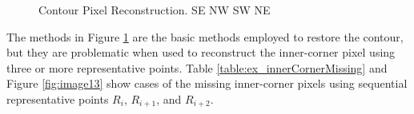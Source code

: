 \begin{figure}[htbp]
	\centering
	\caption{Contour Pixel Reconstruction. \protect{} SE \protect{} NW \protect{} SW \protect{} NE}
	\label{fig:image12}
\end{figure}


The methods in Figure \ref{fig:image12} are the basic methods employed to restore the contour, but they are problematic when used to reconstruct the inner-corner pixel using three or more representative points. Table \ref{table:ex_innerCornerMissing} and Figure \ref{fig:image13} show cases of the missing inner-corner pixels using sequential representative points $R_i$, $R_{i+1}$, and $R_{i+2}$.

